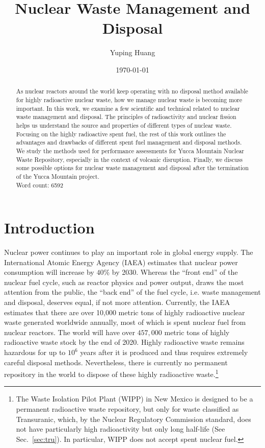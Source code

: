 \documentclass[nofootinbib,preprint,aps]{revtex4-1}
\begin{document}
\title{Nuclear Waste Management and Disposal}

\author{Yuping Huang}%

\date{\today}%
\begin{abstract}
    As nuclear reactors around the world keep operating with no disposal method available for highly
    radioactive nuclear waste, how we manage nuclear waste is becoming more important. In this work,
    we examine a few scientific and technical related to nuclear waste management and disposal.
    The principles of radioactivity and nuclear fission helps us understand the source and properties
    of different types of nuclear waste. Focusing on the highly radioactive spent fuel, the rest
    of this work outlines the advantages and drawbacks of different spent fuel management and disposal
    methods. We study the methods used for performance assessments for Yucca Mountain Nuclear Waste Repository,
    especially in the context of volcanic disruption. Finally, we discuss some possible options for 
    nuclear waste management and disposal after
    the termination of the Yucca Mountain project.\\
    Word count: 6592\\
\end{abstract}
\maketitle
\tableofcontents
\newpage

\section{Introduction}
Nuclear power continues to play an important role in global energy supply.
The International Atomic Energy Agency (IAEA) estimates that nuclear power
consumption will increase by $40\%$ by 2030.\cite{iaea12}
Whereas the ``front end'' of the nuclear fuel cycle, such as reactor physics and power output, draws
the most attention from the public, the ``back end'' of the fuel cycle, i.e. waste management and
disposal, deserves equal, if not more attention.
Currently, the IAEA estimates that there are over 10,000 metric tons of highly radioactive nuclear waste 
generated worldwide annually,
most of which is spent nuclear fuel from nuclear reactors.\cite{iaea08, r12}
The world will have over $457,000$ metric tons of highly radioactive waste stock by the end of 2020.\cite{r12}
Highly radioactive waste remains hazardous for up to $10^6$ years after it is produced and thus
requires extremely careful disposal methods.
Nevertheless, there is currently no permanent repository in the world to dispose of these highly radioactive
waste.\footnote{The Waste Isolation Pilot Plant (WIPP) in New Mexico is designed to be a permanent radioactive
    waste repository, but only
for waste classified as Transuranic, which, by the Nuclear Regulatory Commission standard, does not have particularly
high radioactivity but only long half-life (See Sec.~\ref{sec:tru}). In particular, WIPP does not accept spent nuclear
fuel.}  
\end{document}
